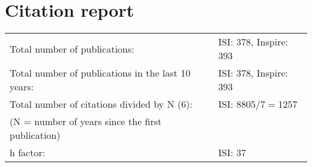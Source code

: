 \documentclass[10pt, a4paper]{article}
\newcommand{\years}[1]{\marginnote{\hskip-0.2in{\small #1}}}
\begin{document}
\section*{Citation report}
\noindent

\begin{tabular}{l l}
Total number of publications: & ISI: 378, Inspire: 393 \\
Total number of publications in the last 10 years: & ISI: 378, Inspire: 393 \\
Total number of citations divided by N (6): & ISI: 8805/7$=$1257\\
(N = number of years since the first publication)  & \\
h factor: & ISI: 37 \\
\end{tabular}



\end{document}
